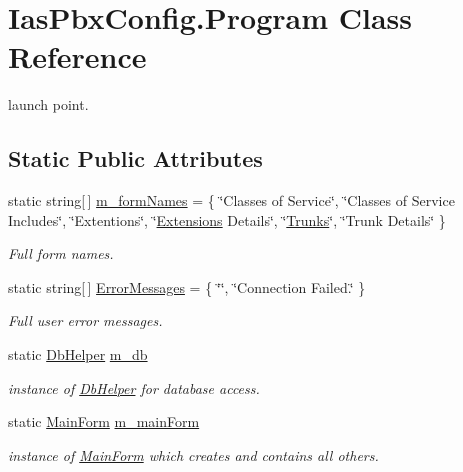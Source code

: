 \hypertarget{class_ias_pbx_config_1_1_program}{
\section{IasPbxConfig.Program Class Reference}
\label{class_ias_pbx_config_1_1_program}
}


launch point.  
\subsection*{Static Public Attributes}
\begin{DoxyCompactItemize}
\item 
static string\mbox{[}$\,$\mbox{]} \hyperlink{class_ias_pbx_config_1_1_program_a2ddc498936b6e3f273297c78de615d3a}{m\_\-formNames} = \{ \char`\"{}Classes of Service\char`\"{}, \char`\"{}Classes of Service Includes\char`\"{}, \char`\"{}Extentions\char`\"{}, \char`\"{}\hyperlink{class_ias_pbx_config_1_1_extensions}{Extensions} Details\char`\"{}, \char`\"{}\hyperlink{class_ias_pbx_config_1_1_trunks}{Trunks}\char`\"{}, \char`\"{}Trunk Details\char`\"{} \}
\begin{DoxyCompactList}\small\item\em Full form names. \item\end{DoxyCompactList}\item 
static string\mbox{[}$\,$\mbox{]} \hyperlink{class_ias_pbx_config_1_1_program_a914e91efe69f6c3856d81120624ba66d}{ErrorMessages} = \{ \char`\"{}\char`\"{}, \char`\"{}Connection Failed.\char`\"{} \}
\begin{DoxyCompactList}\small\item\em Full user error messages. \item\end{DoxyCompactList}\item 
static \hyperlink{class_ias_pbx_config_1_1_db_helper}{DbHelper} \hyperlink{class_ias_pbx_config_1_1_program_a6342106d36b6b4c21bcc82f3113ff69b}{m\_\-db}
\begin{DoxyCompactList}\small\item\em instance of \hyperlink{class_ias_pbx_config_1_1_db_helper}{DbHelper} for database access. \item\end{DoxyCompactList}\item 
static \hyperlink{class_ias_pbx_config_1_1_main_form}{MainForm} \hyperlink{class_ias_pbx_config_1_1_program_a5963cd004a93c98ddceb23bb869a021f}{m\_\-mainForm}
\begin{DoxyCompactList}\small\item\em instance of \hyperlink{class_ias_pbx_config_1_1_main_form}{MainForm} which creates and contains all others. \item\end{DoxyCompactList}\end{DoxyCompactItemize}
